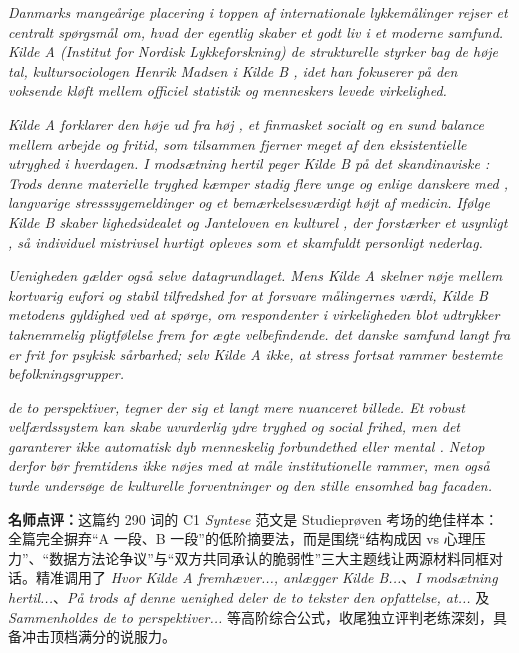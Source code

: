 \begin{answerbox}
\textit{Danmarks mangeårige placering i toppen af internationale lykkemålinger rejser et centralt spørgsmål om, hvad der egentlig skaber et godt liv i et moderne samfund.  Kilde A (Institut for Nordisk Lykkeforskning)  de strukturelle styrker bag de høje tal,  kultursociologen Henrik Madsen i Kilde B , idet han fokuserer på den voksende kløft mellem officiel statistik og menneskers levede virkelighed.}

\textit{Kilde A forklarer den høje  ud fra høj , et finmasket socialt  og en sund balance mellem arbejde og fritid, som tilsammen fjerner meget af den eksistentielle utryghed i hverdagen. I modsætning hertil peger Kilde B på det skandinaviske : Trods denne materielle tryghed kæmper stadig flere unge og enlige danskere med , langvarige stresssygemeldinger og et bemærkelsesværdigt højt  af  medicin. Ifølge Kilde B skaber lighedsidealet og Janteloven en kulturel , der forstærker et usynligt , så individuel mistrivsel hurtigt opleves som et skamfuldt personligt nederlag.}

\textit{Uenigheden gælder også selve datagrundlaget. Mens Kilde A skelner nøje mellem kortvarig eufori og stabil tilfredshed for at forsvare målingernes værdi,  Kilde B metodens gyldighed ved at spørge, om respondenter i virkeligheden blot udtrykker taknemmelig pligtfølelse frem for ægte velbefindende.  det danske samfund langt fra er frit for psykisk sårbarhed; selv Kilde A  ikke, at stress fortsat rammer bestemte befolkningsgrupper.}

\textit{ de to perspektiver, tegner der sig et langt mere nuanceret billede. Et robust velfærdssystem kan skabe uvurderlig ydre tryghed og social frihed, men det garanterer ikke automatisk dyb menneskelig forbundethed eller mental . Netop derfor bør fremtidens  ikke nøjes med at måle institutionelle rammer, men også turde undersøge de kulturelle forventninger og den stille ensomhed bag facaden.}

\small\textbf{名师点评：}这篇约 290 词的 C1 \textit{Syntese} 范文是 Studieprøven 考场的绝佳样本：全篇完全摒弃“A 一段、B 一段”的低阶摘要法，而是围绕“结构成因 vs 心理压力”、“数据方法论争议”与“双方共同承认的脆弱性”三大主题线让两源材料同框对话。精准调用了 \textit{Hvor Kilde A fremhæver..., anlægger Kilde B...}、\textit{I modsætning hertil...}、\textit{På trods af denne uenighed deler de to tekster den opfattelse, at...} 及 \textit{Sammenholdes de to perspektiver...} 等高阶综合公式，收尾独立评判老练深刻，具备冲击顶档满分的说服力。
\end{answerbox}
